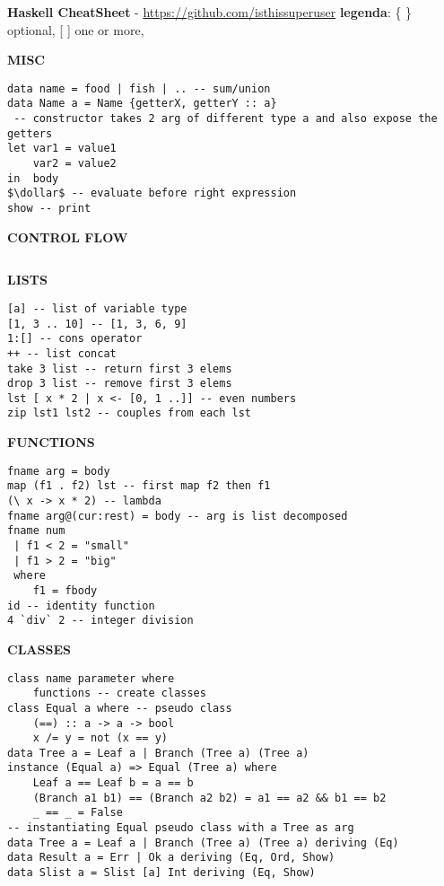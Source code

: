\documentclass{article}
\newcommand{\dollar}{\mbox{\textdollar}}
\begin{document}
\textbf{Haskell CheatSheet} - \href{https://github.com/isthissuperuser}{https://github.com/isthissuperuser} \textbar{ }  \textbf{legenda}: \{ \} optional, [ ] one or more, 
\begin{multicols*}{3}

\hrulefill

\textbf{MISC}
\begin{lstlisting}
data name = food | fish | .. -- sum/union
data Name a = Name {getterX, getterY :: a} 
 -- constructor takes 2 arg of different type a and also expose the getters
let var1 = value1
    var2 = value2
in  body
$\dollar$ -- evaluate before right expression
show -- print
\end{lstlisting}

\hrulefill

\textbf{CONTROL FLOW}
\begin{lstlisting}
\end{lstlisting}

\hrulefill

\textbf{LISTS}
\begin{lstlisting}
[a] -- list of variable type
[1, 3 .. 10] -- [1, 3, 6, 9]
1:[] -- cons operator
++ -- list concat
take 3 list -- return first 3 elems 
drop 3 list -- remove first 3 elems
lst [ x * 2 | x <- [0, 1 ..]] -- even numbers
zip lst1 lst2 -- couples from each lst
\end{lstlisting}

\hrulefill

\textbf{FUNCTIONS}
\begin{lstlisting}
fname arg = body
map (f1 . f2) lst -- first map f2 then f1
(\ x -> x * 2) -- lambda
fname arg@(cur:rest) = body -- arg is list decomposed
fname num
 | f1 < 2 = "small"
 | f1 > 2 = "big"
 where
    f1 = fbody
id -- identity function
4 `div` 2 -- integer division
\end{lstlisting}

\hrulefill

\textbf{CLASSES}
\begin{lstlisting}
class name parameter where
    functions -- create classes
class Equal a where -- pseudo class
    (==) :: a -> a -> bool
    x /= y = not (x == y)
data Tree a = Leaf a | Branch (Tree a) (Tree a)
instance (Equal a) => Equal (Tree a) where
    Leaf a == Leaf b = a == b
    (Branch a1 b1) == (Branch a2 b2) = a1 == a2 && b1 == b2
    _ == _ = False
-- instantiating Equal pseudo class with a Tree as arg
data Tree a = Leaf a | Branch (Tree a) (Tree a) deriving (Eq)
data Result a = Err | Ok a deriving (Eq, Ord, Show)
data Slist a = Slist [a] Int deriving (Eq, Show)
\end{lstlisting}


\end{multicols*}
\end{document}
